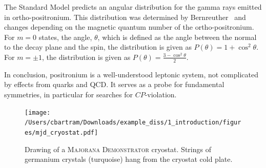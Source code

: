 The Standard Model predicts an angular distribution for the gamma rays emitted in ortho-positronium. This distribution was determined by Bernreuther~\cite{Bernreuther:1981ah} and changes depending on the magnetic quantum number  of the ortho-positronium. For $m=0$ states, the angle, $\theta$, which is defined as the angle between the normal to the decay plane and the spin, the distribution is given as $P(\theta)=1+{\cos}^{2}\theta$. For $m={\pm}1$, the distribution is given as $P(\theta)=\frac{3-{\cos}^2{\theta}}{2}$.

In conclusion, positronium is a well-understood leptonic system, not complicated by effects from quarks and QCD. It serves as a probe for fundamental symmetries, in particular for searches for $CP$-violation.

 \vspace{5mm}


\begin{figure}[htbp]
\centering
\texttt{[image: /Users/cbartram/Downloads/example\_diss/1\_introduction/figures/mjd\_cryostat.pdf]}
\caption[%
\textsc{Majorana Demonstrator} cryostat drawing
]{%
Drawing of a \textsc{Majorana Demonstrator} cryostat. Strings of germanium crystals (turquoise) hang from the cryostat cold plate.
\label{fig:mjd_cryostat}} 
\end{figure}

